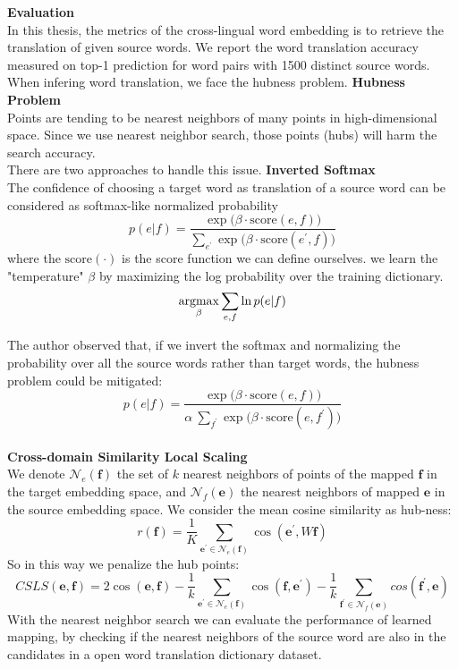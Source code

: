 \textbf{Evaluation}\\
In this thesis, the metrics of the cross-lingual word embedding is to retrieve the translation of given source words. We report the word translation accuracy measured on top-1 prediction for word pairs with 1500 distinct source words.\\
When infering word translation, we face the hubness problem.
\textbf{Hubness Problem}\\
Points are tending to be nearest neighbors of many points in high-dimensional space. Since we use nearest neighbor search, those points (hubs) will harm the search accuracy.\\
There are two approaches to handle this issue.
\textbf{Inverted Softmax}\\
The confidence of choosing a target word as translation of a source word can be considered as softmax-like normalized probability
\[ p(e|f) = \frac{\exp{\Big(\beta \cdot  \text{score}(e,f)\Big)}}{\sum_{e^{\prime}} {\exp{\Big(\beta \cdot \text{score}(e^{\prime}, f)\Big)}}} \]
where the $\text{score}(\cdot)$ is the score function we can define ourselves.
we learn the "temperature" $\beta$ by maximizing the log probability over the training dictionary. 
\[ \underset{\beta}{\operatorname{argmax}} \sum_{e,f} \ln p(e|f)  \]

The author observed that, if we invert the softmax and normalizing the probability over all the source words rather than target words, the hubness problem could be mitigated:
\[ p(e|f) = \frac{\exp{\Big(\beta \cdot  \text{score}(e,f)\Big)}}{\alpha \  \sum_{f^{\prime}} {\exp{\Big(\beta \cdot \text{score}(e, f^{\prime})\Big)}}}\]\\


\textbf{Cross-domain Similarity Local Scaling}\\
We denote ${\mathcal{N}_e(\bm{f})}$ the set of ${k}$ nearest neighbors of points of the mapped $\bm{f}$ in the target embedding space, and ${\mathcal{N}_f(\bm{e})}$ the nearest neighbors of mapped ${\bm{e}}$ in the source embedding space. We consider the mean cosine similarity as hub-ness:
\[ r(\bm{f})= \frac{1}{K} \sum_{\bm{e}^{\prime} \in \mathcal{N}_e(\bm{f})} \cos(\bm{e}^{\prime}, W\bm{f})\]
So in this way we penalize the hub points:
\[ CSLS(\bm{e}, \bm{f}) = 2 \cos(\bm{e}, \bm{f}) - \frac{1}{k} \sum_{\bm{e^{\prime}} \in \mathcal{N}_e(\bm{f})} \cos(\bm{f}, \bm{e^{\prime}})- \frac{1}{k} \sum_{\bm{f^{\prime}} \in \mathcal{N}_f(\bm{e})} cos(\bm{f^{\prime}}, \bm{e}) \]
With the nearest neighbor search we can evaluate the performance of learned mapping, by checking if the nearest neighbors of the source word are also in the candidates in a open word translation dictionary dataset.\\
